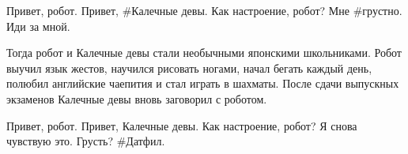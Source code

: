 \begin{dialog}
\X Привет, робот.
\R Привет, \#Калечные девы.
\X Как настроение, робот?
\R Мне \#грустно.
\X Иди за мной.
\end{dialog}

\begin{monolog}
Тогда робот и Калечные девы стали необычными японскими школьниками. Робот выучил язык жестов, научился рисовать ногами, начал бегать каждый день, полюбил английские чаепития и стал играть в шахматы. После сдачи выпускных экзаменов Калечные девы вновь заговорил с роботом.
\end{monolog}

\begin{dialog}
\X Привет, робот.
\R Привет, Калечные девы.
\X Как настроение, робот?
\R Я снова чувствую это.
\X Грусть?
\R \#Датфил.
\end{dialog}